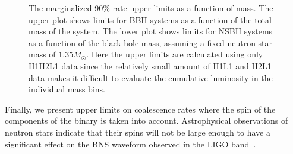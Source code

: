 \begin{figure}[ht]
  \caption{The marginalized 90\% rate upper limits as a function of mass.  The
upper plot shows limits for \ac{BBH} systems as a function of the
total mass of the system.  The lower plot shows limits for \ac{NSBH}
systems as a function of the black hole mass, assuming a fixed
neutron star mass of $1.35 M_{\odot}$. Here the upper limits are 
calculated using only H1H2L1 data since the relatively small amount
of H1L1 and H2L1 data makes it difficult to 
evaluate the cumulative luminosity in the individual mass bins.} 
  \label{fig:ulmass}
\end{figure}
Finally, we present upper limits on coalescence rates where the spin of
the components of the binary is taken into account.  Astrophysical
observations of neutron stars indicate that their spins will not be
large enough to have a significant effect on the \ac{BNS} waveform
observed in the \ac{LIGO} band~\cite{ATNF:psrcat,Apostolatos:1994}.
